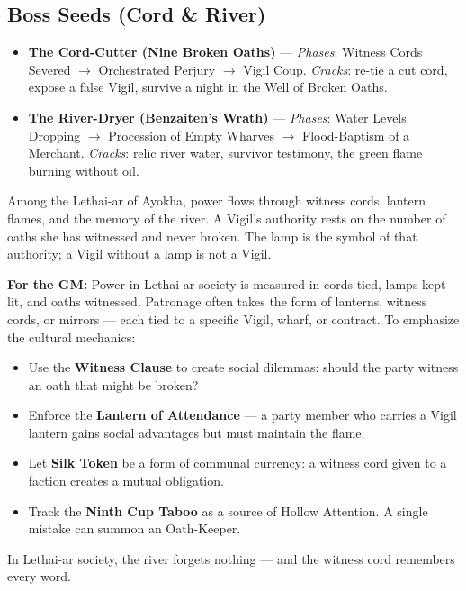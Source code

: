 \subsection*{Boss Seeds (Cord \& River)}
\begin{itemize}
\item \textbf{The Cord-Cutter (Nine Broken Oaths)} --- \emph{Phases}: Witness Cords Severed $\rightarrow$ Orchestrated Perjury $\rightarrow$ Vigil Coup. \emph{Cracks}: re-tie a cut cord, expose a false Vigil, survive a night in the Well of Broken Oaths.
\item \textbf{The River-Dryer (Benzaiten's Wrath)} --- \emph{Phases}: Water Levels Dropping $\rightarrow$ Procession of Empty Wharves $\rightarrow$ Flood-Baptism of a Merchant. \emph{Cracks}: relic river water, survivor testimony, the green flame burning without oil.
\end{itemize}

\begin{tcolorbox}[colback=black!3,colframe=black!40!white,title={Patronage \& Power},breakable]
Among the Lethai-ar of Ayokha, power flows through witness cords, lantern flames, and the memory of the river. A Vigil's authority rests on the number of oaths she has witnessed and never broken. The lamp is the symbol of that authority; a Vigil without a lamp is not a Vigil.

\textbf{For the GM:}  
Power in Lethai-ar society is measured in cords tied, lamps kept lit, and oaths witnessed. Patronage often takes the form of lanterns, witness cords, or mirrors --- each tied to a specific Vigil, wharf, or contract. To emphasize the cultural mechanics:
\begin{itemize}
\item Use the \textbf{Witness Clause} to create social dilemmas: should the party witness an oath that might be broken?
\item Enforce the \textbf{Lantern of Attendance} --- a party member who carries a Vigil lantern gains social advantages but must maintain the flame.
\item Let \textbf{Silk Token} be a form of communal currency: a witness cord given to a faction creates a mutual obligation.
\item Track the \textbf{Ninth Cup Taboo} as a source of Hollow Attention. A single mistake can summon an Oath-Keeper.
\end{itemize}
In Lethai-ar society, the river forgets nothing --- and the witness cord remembers every word.
\end{tcolorbox}

